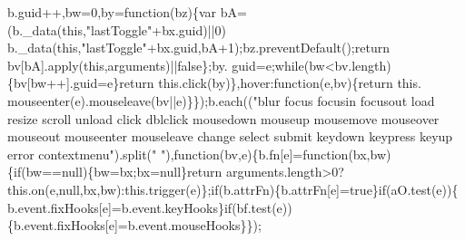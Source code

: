 \begin{DoxyCode}
      b.guid++,bw=0,by=\textcolor{keyword}{function}(bz)\{var bA=(b.\_data(\textcolor{keyword}{this},\textcolor{stringliteral}{"lastToggle"}+bx.guid)||0)%
      b.\_data(\textcolor{keyword}{this},\textcolor{stringliteral}{"lastToggle"}+bx.guid,bA+1);bz.preventDefault();\textcolor{keywordflow}{return} bv[bA].apply(\textcolor{keyword}{this},arguments)||\textcolor{keyword}{false}\};by.
      guid=e;\textcolor{keywordflow}{while}(bw<bv.length)\{bv[bw++].guid=e\}\textcolor{keywordflow}{return} this.click(by)\},hover:\textcolor{keyword}{function}(e,bv)\{\textcolor{keywordflow}{return} this.
      mouseenter(e).mouseleave(bv||e)\}\});b.each((\textcolor{stringliteral}{"blur focus focusin focusout load resize scroll unload click dblclick
       mousedown mouseup mousemove mouseover mouseout mouseenter mouseleave change select submit keydown keypress keyup
       error contextmenu"}).split(\textcolor{stringliteral}{" "}),\textcolor{keyword}{function}(bv,e)\{b.fn[e]=\textcolor{keyword}{function}(bx,bw)\{\textcolor{keywordflow}{if}(bw==null)\{bw=bx;bx=null\}\textcolor{keywordflow}{return} 
      arguments.length>0?this.on(e,null,bx,bw):this.trigger(e)\};\textcolor{keywordflow}{if}(b.attrFn)\{b.attrFn[e]=\textcolor{keyword}{true}\}\textcolor{keywordflow}{if}(aO.test(e))\{
      b.event.fixHooks[e]=b.event.keyHooks\}\textcolor{keywordflow}{if}(bf.test(e))\{b.event.fixHooks[e]=b.event.mouseHooks\}\});


\end{DoxyCode}
